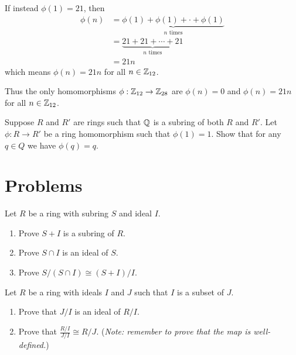 \begin{example}
    If instead $\phi(1) = 21$, then
    \begin{align*}
        \phi(n) &= \underbrace{\phi(1) + \phi(1) + \cdot + \phi(1)}_{n \text{ times}}\\
        &= \underbrace{21 + 21 + \cdots + 21}_{n \text{ times}}\\
        &= 21n
    \end{align*}
    which means $\phi(n) = 21n$ for all $n \in \mathbb{Z}_{12}$.

    Thus the only homomorphisms $\phi: \mathbb{Z}_{12} \to \mathbb{Z}_{28}$ are $\phi(n) = 0$ and $\phi(n) = 21n$ for all $n \in \mathbb{Z}_{12}$.
\end{example}

\begin{exercise}
    Suppose $R$ and $R'$ are rings such that $\mathbb{Q}$ is a subring of both $R$ and $R'$. Let $\phi: R \to R'$ be a ring homomorphism such that $\phi(1) = 1$. Show that for any $q \in Q$ we have $\phi(q) = q$.
\end{exercise}

\newpage

\section{Problems}
\begin{problem}\label{problem-ring-isomorphism-2}
    Let $R$ be a ring with subring $S$ and ideal $I$.
    \begin{enumerate}[label=(\roman*)]
        \item Prove $S+I$ is a subring of $R$.
        \item Prove $S \cap I$ is an ideal of $S$.
        \item Prove $S/(S\cap I)\cong (S+I)/I$.
    \end{enumerate}
\end{problem}
\begin{problem}\label{problem-ring-isomorphism-3}
    Let $R$ be a ring with ideals $I$ and $J$ such that $I$ is a subset of $J$.
    \begin{enumerate}[label=(\roman*)]
        \item Prove that $J/I$ is an ideal of $R/I$.
        \item Prove that $\frac{R/I}{J/I} \cong R/J$.\newline
        (\textit{Note: remember to prove that the map is well-defined.})
    \end{enumerate}
\end{problem}


